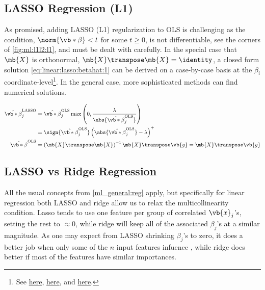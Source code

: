 \subsection{LASSO Regression (L1)}
\label{regression:linear:lasso}

As promised, adding LASSO (L1) regularization to OLS is challenging
as the condition, $\norm{\vb*{\beta}} < t$ for some $t \geq 0$,
is not differentiable, see the corners of \cref{fig:ml:l1l2:l1}, and must be dealt with carefully.
In the special case that $\mb{X}$ is orthonormal, $\mb{X}\transpose \mb{X} = \identity$,
a closed form solution \cref{eq:linear:lasso:betahat:1} can be derived on a case-by-case basis
at the $\beta_{i}$ coordinate-level\footnote{See \href{https://stats.stackexchange.com/questions/17781/derivation-of-closed-form-lasso-solution}{here},
\href{https://en.wikipedia.org/wiki/Lasso_(statistics)\#Orthonormal_covariates}{here},
and \href{https://xavierbourretsicotte.github.io/lasso_derivation.html}{here}.}.
In the general case, more sophisticated methods can find numerical solutions.

\begin{subequations} \label{eq:linear:lasso:betahat_all}
\begin{align}
\hat{\vb*{\beta}}^{\text{LASSO}}_{j}
&= \hat{\vb*{\beta}}^{\text{OLS}}_{j} \max\left(0, \frac{\lambda}{\abs{\hat{\vb*{\beta}}^{\text{OLS}}_{j}}}\right) \label{eq:linear:lasso:betahat:1} \\
&= \sign{\hat{\vb*{\beta}}^{\text{OLS}}_{j}} \left(\abs{\hat{\vb*{\beta}}^{\text{OLS}}_{j}} - \lambda\right)^{+} \label{eq:linear:lasso:betahat:2} \\
\hat{\vb*{\beta}}^{\text{OLS}}
&= \left(\mb{X}\transpose\mb{X}\right)^{-1}\mb{X}\transpose \vb{y}
= \mb{X}\transpose \vb{y} \label{eq:lasso:modified_betahat_OLS}
\end{align}
\end{subequations}

\subsection{LASSO vs Ridge Regression}
\label{regression:linear:lasso_vs_ridge}

All the usual concepts from \cref{ml_general:reg} apply, but specifically for linear regression
both LASSO and ridge allow us to relax the multicollinearity condition.
Lasso tends to use one feature per group of correlated $\vb{x}_{j}$'s, setting the rest to $\approx 0$,
while ridge will keep all of the associated $\beta_{j}$'s at a similar magnitude.
As one may expect from LASSO shrinking $\beta_{j}$'s to zero,
it does a better job when only some of the $n$ input features infuence \yhat,
while ridge does better if most of the features have similar importances.

